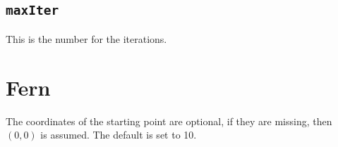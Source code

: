 \documentclass[11pt,english,BCOR10mm,DIV12,bibliography=totoc,parskip=false,
   smallheadings, headexclude,footexclude,oneside]{pst-doc}
\begin{document}
\subsection{\texttt{maxIter}}
This is the number for the iterations.

\begin{PSTexample}
\begin{postscript}
\end{postscript}
\end{PSTexample}



\section{Fern}

\begin{BDef}
\OptArgs\Largr{\CAny}
\end{BDef}

The coordinates of the starting point are optional, if they are missing, then $(0,0)$
is assumed. The default  is set to 10.

\begin{PSTexample}
\begin{postscript}
\end{postscript}
\end{PSTexample}

\begin{PSTexample}
\begin{postscript}
\end{postscript}
\end{PSTexample}

\begin{PSTexample}
\begin{postscript}
\end{postscript}
\end{PSTexample}
\end{document}
